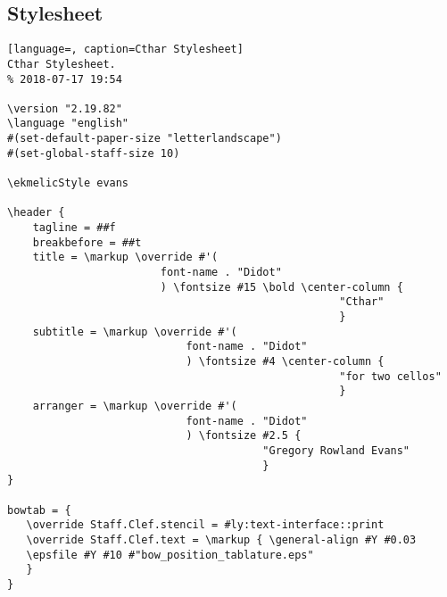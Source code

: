 \subsection{Stylesheet}
\begin{lstlisting}[language=, caption=Cthar Stylesheet]
Cthar Stylesheet.
% 2018-07-17 19:54

\version "2.19.82"
\language "english"
#(set-default-paper-size "letterlandscape")
#(set-global-staff-size 10)

\ekmelicStyle evans

\header {
	tagline = ##f
	breakbefore = ##t
	title = \markup \override #'(
						font-name . "Didot"
						) \fontsize #15 \bold \center-column {
													"Cthar"
													}
	subtitle = \markup \override #'(
							font-name . "Didot"
							) \fontsize #4 \center-column {
													"for two cellos"
													}
	arranger = \markup \override #'(
							font-name . "Didot"
							) \fontsize #2.5 {
										"Gregory Rowland Evans"
										}
}

bowtab = {
   \override Staff.Clef.stencil = #ly:text-interface::print
   \override Staff.Clef.text = \markup { \general-align #Y #0.03
   \epsfile #Y #10 #"bow_position_tablature.eps"
   }
}


\end{lstlisting}
